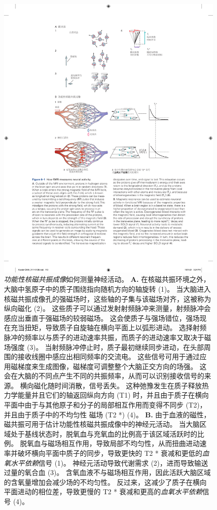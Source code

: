 \begin{figure}[htbp]
	\centering
	\includegraphics[width=0.9\linewidth]{chap06/fig_6_1}
	\caption{\textit{功能性核磁共振成像}如何测量神经活动。
		\textbf{A.} 在核磁共振环境之外，大脑中氢原子中的质子围绕指向随机方向的轴旋转 (1)。
		当大脑进入核磁共振成像孔的强磁场时，这些轴的子集与该磁场对齐，这被称为纵向磁化 (2)。
		这些质子可以通过发射射频脉冲来测量，射频脉冲会感应出垂直于强磁场的较弱磁场。
		这会使质子与强场错位，强场现在充当扭矩，导致质子自旋轴在横向平面上以弧形进动。
		选择射频脉冲的频率以与质子的进动速率共振，而质子的进动速率又取决于磁场强度 (3)。
		当射频脉冲停止时，质子最初继续同步进动，在头部周围的接收线圈中感应出相同频率的交流电。
		这些信号可用于通过应用磁梯度来生成图像，磁梯度可调整整个大脑正交方向的场强。
		这会在大脑的不同点产生不同的共振频率，从而可以识别接收信号的来源。
		横向磁化随时间消散，信号丢失。
		这种弛豫发生在质子释放热力学能量并且它们的轴返回纵向方向 (T1) 时，并且由于质子在横向平面中由于与其他原子和分子的局部相互作用而变得不同步 (T2)，并且由于质子中的不均匀性 磁场 (T2 *) (4)。
		\textbf{B.} 由于血液的磁性，磁共振可用于估计功能性核磁共振成像中的神经元活动。
		当大脑区域处于基线状态时，脱氧血与充氧血的比例高于该区域活跃时的比例。
		脱氧血与磁场相互作用，导致局部不均匀性，从而扭曲进动速率并破坏横向平面中质子的同步，导致更快的 T2 * 衰减和更低的\textit{血氧水平依赖}信号 (1)。
		神经元活动导致代谢需求 (2)，进而导致输送过量的氧合血 (3)。
		含氧血液不与磁场相互作用，因此活跃大脑区域的含氧量增加会减少场的不均匀性。
		反过来，这减少了质子在横向平面进动的相位差，导致更慢的 T2 * 衰减和更高的\textit{血氧水平依赖}信号 (4)。}
	\label{fig:6_1}
\end{figure}



